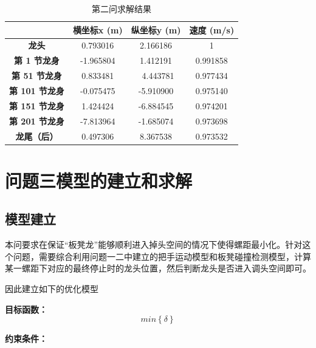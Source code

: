 \documentclass[withoutpreface,bwprint]{cumcmthesis}
\begin{document}
\begin{table}[!ht]
    \centering
    \begin{tabular}{|c|c|c|c|}
    \hline
        \textbf{} & \textbf{横坐标x (m)} & \textbf{纵坐标y (m)} & \textbf{速度 (m/s) } \\ \hline
        \textbf{龙头 } & 0.793016 & 2.166186 &  1 \\ \hline
        \textbf{第 1 节龙身 } & -1.965804& 1.412191 &  0.991858 \\ \hline
        \textbf{第 51 节龙身 } & 0.833481 & ~4.443781 &  0.977434 \\ \hline
        \textbf{第 101 节龙身 } & -0.075475 & -5.910900 &  0.975140 \\ \hline
        \textbf{第 151 节龙身} & 1.424424 & -6.884545 &  0.974201 \\ \hline
        \textbf{第 201 节龙身 } & -7.813964 & -1.685074& 0.973698  \\ \hline
        \textbf{龙尾（后）} & 0.497306 & 8.367538 & 0.973532  \\ \hline
    \end{tabular}
    \caption{第二问求解结果}
    \label{第二问求解结果}
\end{table}


\section{问题三模型的建立和求解}
\subsection{模型建立}

本问要求在保证“板凳龙”能够顺利进入掉头空间的情况下使得螺距最小化。针对这个问题，需要综合利用问题一二中建立的把手运动模型和板凳碰撞检测模型，计算某一螺距下对应的最终停止时的龙头位置，然后判断龙头是否进入调头空间即可。

因此建立如下的优化模型

\textbf{目标函数：} 
$$
min\left \{ \delta  \right \} 
$$

\textbf{约束条件：} 
\end{document}
